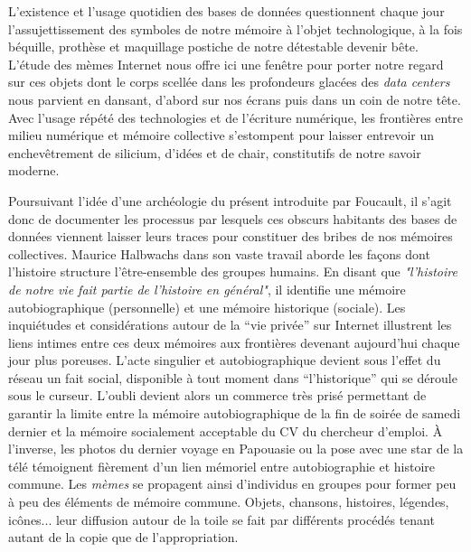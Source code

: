 L{\textquoteright}existence et l{\textquoteright}usage quotidien des bases de donn\'ees questionnent chaque jour l{\textquoteright}assujettissement des symboles de notre m\'emoire \`a l{\textquoteright}objet technologique, \`a la fois b\'equille, proth\`ese et maquillage postiche de notre d\'etestable devenir b\^ete. L{\textquoteright}\'etude des m\`emes Internet nous offre ici une fen\^etre pour porter notre regard sur ces objets dont le corps scell\'ee dans les profondeurs glac\'ees des \textit{data centers }nous parvient en dansant, d{\textquoteright}abord sur nos \'ecrans puis dans un coin de notre t\^ete. Avec l{\textquoteright}usage r\'ep\'et\'e des technologies et de l{\textquoteright}\'ecriture num\'erique, les fronti\`eres entre milieu num\'erique et m\'emoire collective s{\textquoteright}estompent pour laisser entrevoir un enchev\^etrement de silicium, d{\textquoteright}id\'ees et de chair, constitutifs de notre savoir moderne. 

Poursuivant l{\textquoteright}id\'ee d{\textquoteright}une arch\'eologie du pr\'esent introduite par Foucault, il s{\textquoteright}agit donc de documenter les processus par lesquels ces obscurs habitants des bases de donn\'ees viennent laisser leurs traces pour constituer des bribes de nos m\'emoires collectives. Maurice Halbwachs dans son vaste travail aborde les fa\c{c}ons dont l{\textquoteright}histoire structure l{\textquoteright}\^etre-ensemble des groupes humains. En disant que \textit{"l'histoire de notre vie fait partie de l'histoire en général"}\cite{Halbwachs1947}, il identifie une m\'emoire autobiographique (personnelle) et une m\'emoire historique (sociale). Les inqui\'etudes et consid\'erations autour de la {\textquotedblleft}vie priv\'ee{\textquotedblright} sur Internet illustrent les liens intimes entre ces deux m\'emoires aux fronti\`eres devenant aujourd{\textquoteright}hui chaque jour plus poreuses. L{\textquoteright}acte singulier et autobiographique devient sous l{\textquoteright}effet du r\'eseau un fait social, disponible \`a tout moment dans {\textquotedblleft}l{\textquoteright}historique{\textquotedblright} qui se d\'eroule sous le curseur. L{\textquoteright}oubli devient alors un commerce tr\`es pris\'e permettant de garantir la limite entre la m\'emoire autobiographique de la fin de soir\'ee de samedi dernier et la m\'emoire socialement acceptable du CV du chercheur d{\textquoteright}emploi. \`A l{\textquoteright}inverse, les photos du dernier voyage en Papouasie ou la pose avec une star de la t\'el\'e t\'emoignent fi\`erement d{\textquoteright}un lien m\'emoriel entre autobiographie et histoire commune. Les \textit{m\`emes} se propagent ainsi d{\textquoteright}individus en groupes pour former peu \`a peu des \'el\'ements de m\'emoire commune. Objets, chansons, histoires, l\'egendes, ic\^ones... leur diffusion autour de la toile se fait par diff\'erents proc\'ed\'es tenant autant de la copie que de l{\textquoteright}appropriation. 

